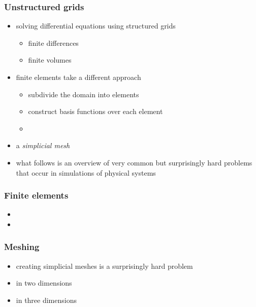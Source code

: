 %
%
%
%


\begin{frame}[fragile]
%
  \frametitle{Unstructured grids}
%
  \begin{itemize}
%
  \item solving differential equations using structured grids
    \begin{itemize}
    \item finite differences
    \item finite volumes
    \end{itemize}
%
  \item finite elements take a different approach
    \begin{itemize}
    \item subdivide the domain into elements
    \item construct basis functions over each element
    \item 
    \end{itemize}
%
  \item a {\em simplicial mesh}
%
  \item what follows is an overview of very common but surprisingly hard problems that occur in
    simulations of physical systems
  \end{itemize}
%
\end{frame}

\begin{frame}[fragile]
%
  \frametitle{Finite elements}
%
  \begin{itemize}
%
  \item 
%
  \item 
%
  \end{itemize}
%
\end{frame}

\begin{frame}[fragile]
%
  \frametitle{Meshing}
%
  \begin{itemize}
%
  \item creating simplicial meshes is a surprisingly hard problem
%
  \item in two dimensions
%
  \item in three dimensions
%
  \end{itemize}
%
\end{frame}

